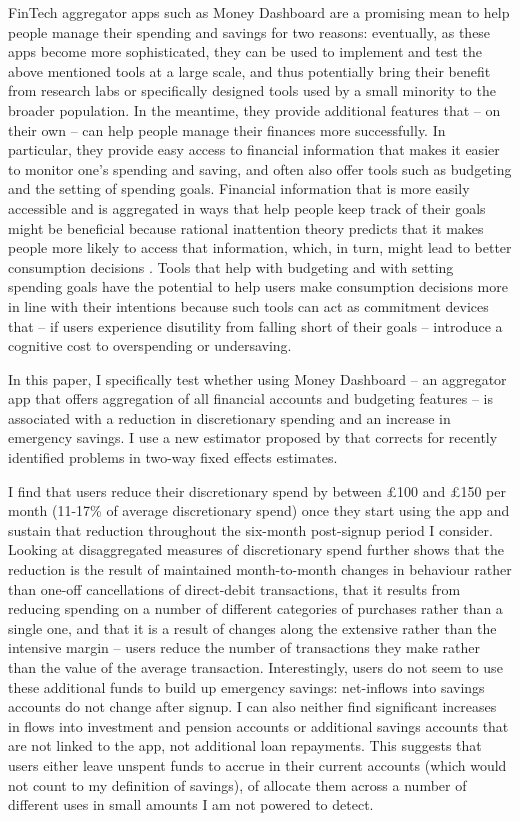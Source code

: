 FinTech aggregator apps such as Money Dashboard are a promising mean to help
people manage their spending and savings for two reasons: eventually, as these
apps become more sophisticated, they can be used to implement and test the
above mentioned tools at a large scale, and thus potentially bring their
benefit from research labs or specifically designed tools used by a small
minority to the broader population. In the meantime, they provide additional
features that -- on their own -- can help people manage their finances more
successfully. In particular, they provide easy access to financial information
that makes it easier to monitor one's spending and saving, and often also offer
tools such as budgeting and the setting of spending goals. Financial
information that is more easily accessible and is aggregated in ways that help
people keep track of their goals might be beneficial because rational
inattention theory predicts that it makes people more likely to access that
information, which, in turn, might lead to better consumption decisions
\citet{brunnermeier2008wealth, dellavigna2009psychology, sims2003implications}.
Tools that help with budgeting and with setting spending goals have the
potential to help users make consumption decisions more in line with their
intentions because such tools can act as commitment devices that -- if users
experience disutility from falling short of their goals -- introduce a
cognitive cost to overspending or undersaving.

In this paper, I specifically test whether using Money Dashboard -- an
aggregator app that offers aggregation of all financial accounts and budgeting
features -- is associated with a reduction in discretionary spending and an
increase in emergency savings. I use a new estimator proposed by
\citet{callaway2021difference} that corrects for recently identified problems
in two-way fixed effects estimates.

I find that users reduce their discretionary spend by between \pounds100 and
\pounds150 per month (11-17\% of average discretionary spend) once they start
using the app and sustain that reduction throughout the six-month post-signup
period I consider. Looking at disaggregated measures of discretionary spend
further shows that the reduction is the result of maintained month-to-month
changes in behaviour rather than one-off cancellations of direct-debit
transactions, that it results from reducing spending on a number of different
categories of purchases rather than a single one, and that it is a result of
changes along the extensive rather than the intensive margin -- users reduce
the number of transactions they make rather than the value of the average
transaction.  Interestingly, users do not seem to use these additional funds to
build up emergency savings: net-inflows into savings accounts do not change
after signup. I can also neither find significant increases in flows into
investment and pension accounts or additional savings accounts that are not
linked to the app, not additional loan repayments. This suggests that users
either leave unspent funds to accrue in their current accounts (which would not
count to my definition of savings), of allocate them across a number of
different uses in small amounts I am not powered to detect.

